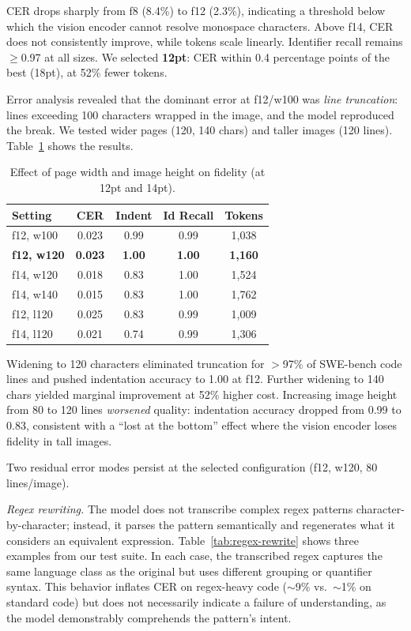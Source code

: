 CER drops sharply from f8 (8.4\%) to f12 (2.3\%), indicating a threshold below which the vision encoder cannot resolve monospace characters. Above f14, CER does not consistently improve, while tokens scale linearly. Identifier recall remains $\ge$0.97 at all sizes. We selected \textbf{12pt}: CER within 0.4 percentage points of the best (18pt), at 52\% fewer tokens.

Error analysis revealed that the dominant error at f12/w100 was \emph{line truncation}: lines exceeding 100 characters wrapped in the image, and the model reproduced the break. We tested wider pages (120, 140 chars) and taller images (120 lines). Table~\ref{tab:pagewidth} shows the results.

\begin{table}[t]
\centering
\caption{Effect of page width and image height on fidelity (at 12pt and 14pt).}
\label{tab:pagewidth}
\small
\begin{tabular}{lcccc}
\toprule
\textbf{Setting} & \textbf{CER} & \textbf{Indent} & \textbf{Id Recall} & \textbf{Tokens} \\
\midrule
f12, w100        & 0.023 & 0.99 & 0.99 & 1{,}038 \\
\textbf{f12, w120} & \textbf{0.023} & \textbf{1.00} & \textbf{1.00} & \textbf{1{,}160} \\
f14, w120        & 0.018 & 0.83 & 1.00 & 1{,}524 \\
f14, w140        & 0.015 & 0.83 & 1.00 & 1{,}762 \\
\midrule
f12, l120        & 0.025 & 0.83 & 0.99 & 1{,}009 \\
f14, l120        & 0.021 & 0.74 & 0.99 & 1{,}306 \\
\bottomrule
\end{tabular}
\end{table}

Widening to 120 characters eliminated truncation for $>$97\% of SWE-bench code lines and pushed indentation accuracy to 1.00 at f12. Further widening to 140 chars yielded marginal improvement at 52\% higher cost. Increasing image height from 80 to 120 lines \emph{worsened} quality: indentation accuracy dropped from 0.99 to 0.83, consistent with a ``lost at the bottom'' effect where the vision encoder loses fidelity in tall images.

Two residual error modes persist at the selected configuration (f12, w120, 80 lines/image).

\emph{Regex rewriting.} The model does not transcribe complex regex patterns character-by-character; instead, it parses the pattern semantically and regenerates what it considers an equivalent expression. Table~\ref{tab:regex-rewrite} shows three examples from our test suite. In each case, the transcribed regex captures the same language class as the original but uses different grouping or quantifier syntax. This behavior inflates CER on regex-heavy code ($\sim$9\% vs.\ $\sim$1\% on standard code) but does not necessarily indicate a failure of understanding, as the model demonstrably comprehends the pattern's intent.

